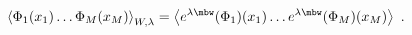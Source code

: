 \begin{equation}\label{defm}
\left<\Phi_1(x_1)\dots
\Phi_M(x_M)\right>_{W,\lambda}=
\left<e^{\lambda\mbw}(\Phi_1)(x_1)\dots
e^{\lambda\mbw}(\Phi_M)(x_M)\right> \ .
\end{equation}

